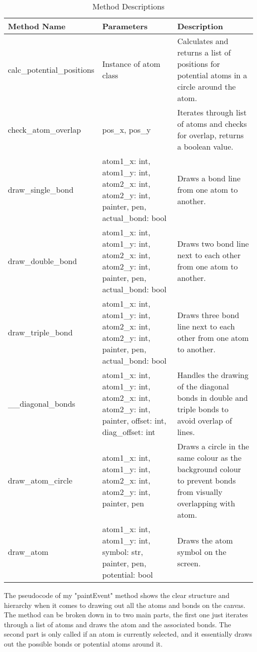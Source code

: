 \documentclass[a4paper,12pt]{article}
\begin{document}
\begin{table}[htbp]
    \centering
    \begin{tabularx}{\textwidth}{|X|X|X|}
        \hline
        \textbf{Method Name} & \textbf{Parameters} & \textbf{Description}\\
        \hline
        calc\_potential\_positions & Instance of atom class & Calculates and returns a list of positions for potential atoms in a circle around the atom. \\
        \hline
        check\_atom\_overlap & pos\_x, pos\_y & Iterates through list of atoms and checks for overlap, returns a boolean value. \\
        \hline
        draw\_single\_bond & atom1\_x: int, atom1\_y: int, atom2\_x: int, atom2\_y: int, painter, pen, actual\_bond: bool & Draws a bond line from one atom to another. \\
        \hline
        draw\_double\_bond & atom1\_x: int, atom1\_y: int, atom2\_x: int, atom2\_y: int, painter, pen, actual\_bond: bool & Draws two bond line next to each other from one atom to another. \\
        \hline
        draw\_triple\_bond & atom1\_x: int, atom1\_y: int, atom2\_x: int, atom2\_y: int, painter, pen, actual\_bond: bool & Draws three bond line next to each other from one atom to another. \\
        \hline
        \_\_diagonal\_bonds & atom1\_x: int, atom1\_y: int, atom2\_x: int, atom2\_y: int, painter, offset: int, diag\_offset: int & Handles the drawing of the diagonal bonds in double and triple bonds to avoid overlap of lines. \\
        \hline
        draw\_atom\_circle & atom1\_x: int, atom1\_y: int, atom2\_x: int, atom2\_y: int, painter, pen & Draws a circle in the same colour as the background colour to prevent bonds from visually overlapping with atom. \\
        \hline
        draw\_atom & atom1\_x: int, atom1\_y: int, symbol: str, painter, pen, potential: bool & Draws the atom symbol on the screen. \\
        \hline
    \end{tabularx}
    \caption{Method Descriptions}
    \label{tab:paintevent_methods}
\end{table}

\newpage

The pseudocode of my "paintEvent" method shows the clear structure and hierarchy when it comes to drawing out all the atoms and bonds on the canvas. The method can be broken down in to two main parts, the first one just iterates through a list of atoms and draws the atom and the associated bonds. The second part is only called if an atom is currently selected, and it essentially draws out the possible bonds or potential atoms around it.
\end{document}
